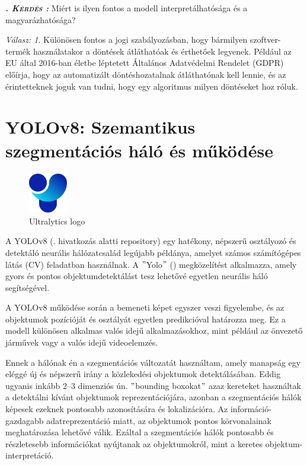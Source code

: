\documentclass[12pt,oneside,a4paper]{article}
\newcommand{\newsection}[1]{\clearpage\section{#1}}\label{makro}
\theoremstyle{remark}
\newtheorem{remarkth}{Válasz:}
\newenvironment{remark}{\begin{remarkth}}{\end{remarkth}}
\newcounter{question}
\newenvironment{kerdes}{%
	\refstepcounter{question}%
	\medskip%
	\par\noindent\ignorespaces%
	\textit{\textsc{\textbf{\thequestion.  Kérdés :}}}%
	\medskip
	\textsf%
	}{%
		\medskip
	}
\begin{document}
\begin{kerdes}
    Miért is ilyen fontos a modell interpretálhatósága és a magyarázhatósága?
\end{kerdes}
\begin{remark}
    Különösen fontos a jogi szabályozásban, hogy bármilyen szoftver-termék használatakor a döntések átláthatóak és
    érthetőek legyenek.
    Például az \ac{EU} által 2016-ban életbe léptetett Általános Adatvédelmi Rendelet (\ac{GDPR}) előírja, hogy az
    automatizált döntéshozatalnak átláthatónak kell lennie, és az érintetteknek joguk van tudni, hogy egy algoritmus
    milyen döntéseket hoz róluk.
\end{remark}
\newsection{YOLOv8: Szemantikus szegmentációs háló és működése}\label{sec:yolov8:-szemantikus-szegmentacios-halo}
    \begin{figure}
    	\centering
    	\vspace{-10pt} %
    	\includegraphics[width=0.15\textwidth]{Ultralytics}
    	\vspace{-10pt} %
    	\caption{Ultralytics logo}
    	\label{fig:Ultralytics}
    \end{figure}
    A YOLOv8 (\cite{Yolov8}. hivatkozás alatti repository)\label{irodalomhivatkozas} egy hatékony, népszerű osztályozó és detektáló neurális
    hálózatcsalád legújabb példánya, amelyet számos számítógépes látás (\ac{CV})
    feladatban használnak.
    A \("\)\gls{Yolo}\("\) () megközelítést alkalmazza,
    amely gyors és pontos objektumdetektálást tesz lehetővé egyetlen neurális háló segítségével.


    A YOLOv8 működése során a bemeneti képet egyszer veszi figyelembe, és az objektumok pozícióját
    és osztályát egyetlen predikcióval határozza meg.
    Ez a modell különösen alkalmas valós
    idejű alkalmazásokhoz, mint például az önvezető járművek vagy a valós idejű videoelemzés.

    Ennek a hálónak én a szegmentációs változatát használtam, amely manapság egy eléggé új és népszerű
    irány a közlekedési objektumok detektálásában.
    Eddig ugyanis inkább 2--3 dimenziós ún. \("\)bounding boxokat\("\) azaz kereteket használtak a detektálni kívánt
    objektumok reprezentációjára, azonban a szegmentációs hálók képesek  ezeknek pontosabb azonosítására és
    lokalizációra.
    Az információ-gazdagabb  adatreprezentáció miatt, az objektumok pontos körvonalainak meghatározása lehetővé válik.
    Ezáltal a szegmentációs hálók pontosabb és részletesebb információkat nyújtanak az objektumokról,
    mint a keretes objektum-interpretáció.
\end{document}

